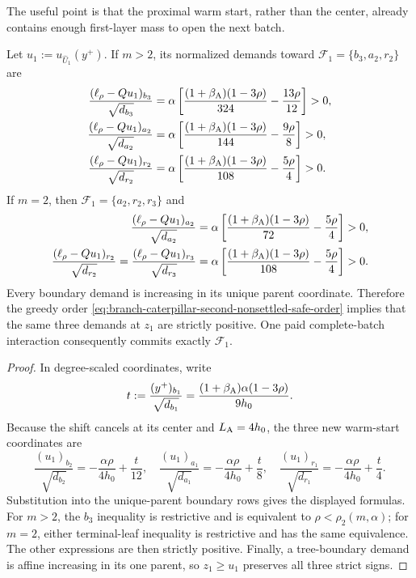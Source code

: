 The useful point is that the proximal warm start, rather than the center,
already contains enough first-layer mass to open the next batch.

\begin{lemma}
\label{lem:branch-caterpillar-second-nonsettled-admission}
Let $u_1:=u_{\widehat U_1}(y^+)$.  If $m>2$, its normalized demands toward
$\mathcal F_1=\{b_3,a_2,r_2\}$ are
\begin{align}
 \frac{(\ell_\rho-Qu_1)_{b_3}}{\sqrt{d_{b_3}}}
 &=\alpha\left[
   \frac{(1+\beta_{\rm A})(1-3\rho)}{324}
   -\frac{13\rho}{12}\right]>0,
 \notag\\
 \frac{(\ell_\rho-Qu_1)_{a_2}}{\sqrt{d_{a_2}}}
 &=\alpha\left[
   \frac{(1+\beta_{\rm A})(1-3\rho)}{144}
   -\frac{9\rho}{8}\right]>0,
 \notag\\
 \frac{(\ell_\rho-Qu_1)_{r_2}}{\sqrt{d_{r_2}}}
 &=\alpha\left[
   \frac{(1+\beta_{\rm A})(1-3\rho)}{108}
   -\frac{5\rho}{4}\right]>0.
 \label{eq:branch-caterpillar-second-nonsettled-margins}
\end{align}
If $m=2$, then $\mathcal F_1=\{a_2,r_2,r_3\}$ and
\begin{align}
 \frac{(\ell_\rho-Qu_1)_{a_2}}{\sqrt{d_{a_2}}}
 &=\alpha\left[
   \frac{(1+\beta_{\rm A})(1-3\rho)}{72}
   -\frac{5\rho}{4}\right]>0,
 \notag\\
 \frac{(\ell_\rho-Qu_1)_{r_2}}{\sqrt{d_{r_2}}}
 =\frac{(\ell_\rho-Qu_1)_{r_3}}{\sqrt{d_{r_3}}}
 &=\alpha\left[
   \frac{(1+\beta_{\rm A})(1-3\rho)}{108}
   -\frac{5\rho}{4}\right]>0.
 \label{eq:branch-caterpillar-second-nonsettled-terminal-margins}
\end{align}
Every boundary demand is increasing in its unique parent coordinate.
Therefore the greedy order
\cref{eq:branch-caterpillar-second-nonsettled-safe-order} implies that the
same three demands at $z_1$ are strictly positive.  One paid complete-batch
interaction consequently commits exactly $\mathcal F_1$.
\end{lemma}

\begin{proof}
In degree-scaled coordinates, write
\begin{equation*}
 t:=\frac{(y^+)_{b_1}}{\sqrt{d_{b_1}}}
 =\frac{(1+\beta_{\rm A})\alpha(1-3\rho)}{9h_0}.
\end{equation*}
Because the shift cancels at its center and $L_{\rm A}=4h_0$, the three new
warm-start coordinates are
\begin{equation*}
 \frac{(u_1)_{b_2}}{\sqrt{d_{b_2}}}
 =-\frac{\alpha\rho}{4h_0}+\frac{t}{12},\quad
 \frac{(u_1)_{a_1}}{\sqrt{d_{a_1}}}
 =-\frac{\alpha\rho}{4h_0}+\frac{t}{8},\quad
 \frac{(u_1)_{r_1}}{\sqrt{d_{r_1}}}
 =-\frac{\alpha\rho}{4h_0}+\frac{t}{4}.
\end{equation*}
Substitution into the unique-parent boundary rows gives the displayed
formulas.  For $m>2$, the $b_3$ inequality is restrictive and is equivalent
to $\rho<\rho_2(m,\alpha)$; for $m=2$, either terminal-leaf inequality is
restrictive and has the same equivalence.  The other expressions are then
strictly positive.  Finally, a tree-boundary demand is affine increasing in
its one parent, so $z_1\geq u_1$ preserves all three strict signs.
\end{proof}

